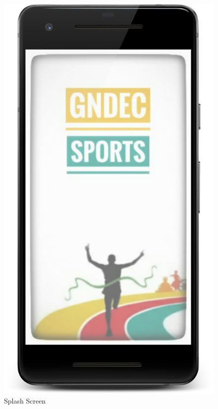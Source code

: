 \begin{figure}[ht]
\centering
\includegraphics[scale=0.07]{images/S1.png}
\caption{Splash Screen}
\end{figure}

